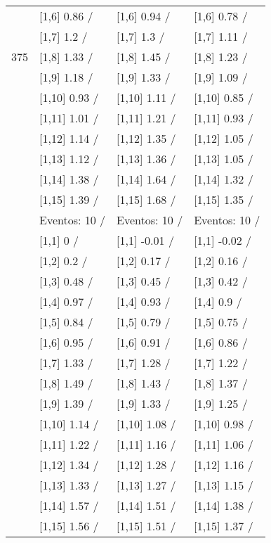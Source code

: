 \begin{table}
\begin{tabular}[t]{llll}
 & {}[1,6] 0.86  / & {}[1,6] 0.94  / & {}[1,6] 0.78  /\\
 & {}[1,7] 1.2  / & {}[1,7] 1.3  / & {}[1,7] 1.11  /\\
375 & {}[1,8] 1.33  / & {}[1,8] 1.45  / & {}[1,8] 1.23  /\\
\addlinespace
 & {}[1,9] 1.18  / & {}[1,9] 1.33  / & {}[1,9] 1.09  /\\
 & {}[1,10] 0.93  / & {}[1,10] 1.11  / & {}[1,10] 0.85  /\\
 & {}[1,11] 1.01  / & {}[1,11] 1.21  / & {}[1,11] 0.93  /\\
 & {}[1,12] 1.14  / & {}[1,12] 1.35  / & {}[1,12] 1.05  /\\
 & {}[1,13] 1.12  / & {}[1,13] 1.36  / & {}[1,13] 1.05  /\\
\addlinespace
 & {}[1,14] 1.38  / & {}[1,14] 1.64  / & {}[1,14] 1.32  /\\
 & {}[1,15] 1.39  / & {}[1,15] 1.68  / & {}[1,15] 1.35  /\\
 & Eventos:  10 / & Eventos:  10 / & Eventos:  10 /\\
 & {}[1,1] 0  / & {}[1,1] -0.01  / & {}[1,1] -0.02  /\\
 & {}[1,2] 0.2  / & {}[1,2] 0.17  / & {}[1,2] 0.16  /\\
\addlinespace
 & {}[1,3] 0.48  / & {}[1,3] 0.45  / & {}[1,3] 0.42  /\\
 & {}[1,4] 0.97  / & {}[1,4] 0.93  / & {}[1,4] 0.9  /\\
 & {}[1,5] 0.84  / & {}[1,5] 0.79  / & {}[1,5] 0.75  /\\
 & {}[1,6] 0.95  / & {}[1,6] 0.91  / & {}[1,6] 0.86  /\\
 & {}[1,7] 1.33  / & {}[1,7] 1.28  / & {}[1,7] 1.22  /\\
\addlinespace
500 & {}[1,8] 1.49  / & {}[1,8] 1.43  / & {}[1,8] 1.37  /\\
 & {}[1,9] 1.39  / & {}[1,9] 1.33  / & {}[1,9] 1.25  /\\
 & {}[1,10] 1.14  / & {}[1,10] 1.08  / & {}[1,10] 0.98  /\\
 & {}[1,11] 1.22  / & {}[1,11] 1.16  / & {}[1,11] 1.06  /\\
 & {}[1,12] 1.34  / & {}[1,12] 1.28  / & {}[1,12] 1.16  /\\
\addlinespace
 & {}[1,13] 1.33  / & {}[1,13] 1.27  / & {}[1,13] 1.15  /\\
 & {}[1,14] 1.57  / & {}[1,14] 1.51  / & {}[1,14] 1.38  /\\
 & {}[1,15] 1.56  / & {}[1,15] 1.51  / & {}[1,15] 1.37  /\\
\bottomrule
\end{tabular}
\end{table}
